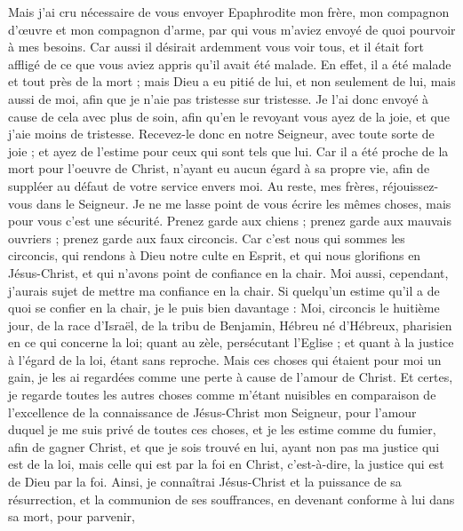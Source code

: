 \begin{multicols}{2}
Mais j'ai cru nécessaire de vous envoyer Epaphrodite mon frère, mon compagnon d'œuvre et mon compagnon d'arme, par qui vous m'aviez envoyé de quoi pourvoir à mes besoins.
Car aussi il désirait ardemment vous voir tous, et il était fort affligé de ce que vous aviez appris qu'il avait été malade.
En effet, il a été malade et tout près de la mort ; mais Dieu a eu pitié de lui, et non seulement de lui, mais aussi de moi, afin que je n'aie pas tristesse sur tristesse.
Je l'ai donc envoyé à cause de cela avec plus de soin, afin qu'en le revoyant vous ayez de la joie, et que j'aie moins de tristesse.
Recevez-le donc en notre Seigneur, avec toute sorte de joie ; et ayez de l'estime pour ceux qui sont tels que lui. 
Car il a été proche de la mort pour l'oeuvre de Christ, n'ayant eu aucun égard à sa propre vie, afin de suppléer au défaut de votre service envers moi.
\VerseOne{}Au reste, mes frères, réjouissez-vous dans le Seigneur. Je ne me lasse point de vous écrire les mêmes choses, mais pour vous c'est une sécurité.
Prenez garde aux chiens ; prenez garde aux mauvais ouvriers ; prenez garde aux faux circoncis.
Car c'est nous qui sommes les circoncis, qui rendons à Dieu notre culte en Esprit, et qui nous glorifions en Jésus-Christ, et qui n'avons point de confiance en la chair.
Moi aussi, cependant, j'aurais sujet de mettre ma confiance en la chair. Si quelqu'un estime qu'il a de quoi se confier en la chair, je le puis bien davantage :
Moi, circoncis le huitième jour, de la race d'Israël, de la tribu de Benjamin, Hébreu né d'Hébreux, pharisien en ce qui concerne la loi;
quant au zèle, persécutant l'Eglise ; et quant à la justice à l'égard de la loi, étant sans reproche.
Mais ces choses qui étaient pour moi un gain, je les ai regardées comme une perte à cause de l'amour de Christ.
Et certes, je regarde toutes les autres choses comme m'étant nuisibles en comparaison de l'excellence de la connaissance de Jésus-Christ mon Seigneur, pour l'amour duquel je me suis privé de toutes ces choses, et je les estime comme du fumier, afin de gagner Christ,
et que je sois trouvé en lui, ayant non pas ma justice qui est de la loi, mais celle qui est par la foi en Christ, c'est-à-dire, la justice qui est de Dieu par la foi.
Ainsi, je connaîtrai Jésus-Christ et la puissance de sa résurrection, et la communion de ses souffrances, en devenant conforme à lui dans sa mort, pour parvenir,

\end{multicols}
